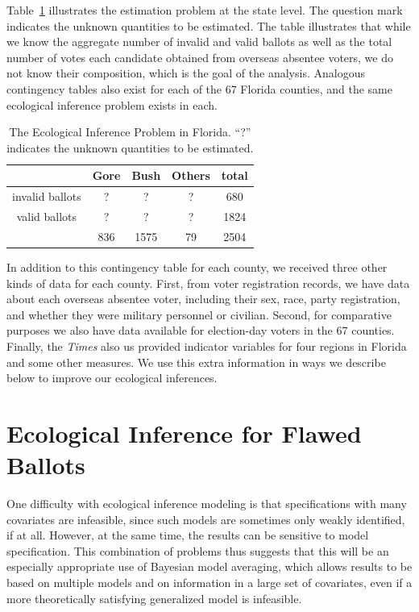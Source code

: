 \documentclass[11pt,titlepage]{article}
\begin{document}
Table~\ref{tb:ballots} illustrates the estimation problem at the state
level. The question mark indicates the unknown quantities to be
estimated.  The table illustrates that while we know the aggregate
number of invalid and valid ballots as well as the total number of
votes each candidate obtained from overseas absentee voters, we do not
know their composition, which is the goal of the analysis.  Analogous
contingency tables also exist for each of the 67 Florida counties, and
the same ecological inference problem exists in each.
\begin{table}[t]
  \begin{center}
    \begin{tabular}{ccccc}
      & Gore  & Bush & Others & total  \\
      \hline 
      invalid ballots &   ?   &   ?  &   ?    &  680   \\
      valid ballots   &   ?   &   ?  &   ?    & 1824   \\
      \hline
      & 836   & 1575 &   79   & 2504   \\
    \end{tabular} \caption{The Ecological Inference Problem in Florida.  
      ``?'' indicates the unknown quantities to be
      estimated.}\label{tb:ballots}
  \end{center}
\end{table} 

In addition to this contingency table for each county, we received
three other kinds of data for each county.  First, from voter
registration records, we have data about each overseas absentee voter,
including their sex, race, party registration, and whether they were
military personnel or civilian.  Second, for comparative purposes we
also have data available for election-day voters in the 67 counties.
Finally, the \emph{Times} also us provided indicator variables for
four regions in Florida and some other measures.  We use this extra
information in ways we describe below to improve our ecological
inferences.

\section{Ecological Inference for Flawed Ballots} \label{s:ecinf}

One difficulty with ecological inference modeling is that
specifications with many covariates are infeasible, since such models
are sometimes only weakly identified, if at all.  However, at the same
time, the results can be sensitive to model specification.  This
combination of problems thus suggests that this will be an especially
appropriate use of Bayesian model averaging, which allows results to
be based on multiple models and on information in a large set of
covariates, even if a more theoretically satisfying generalized model
is infeasible.
\end{document}
